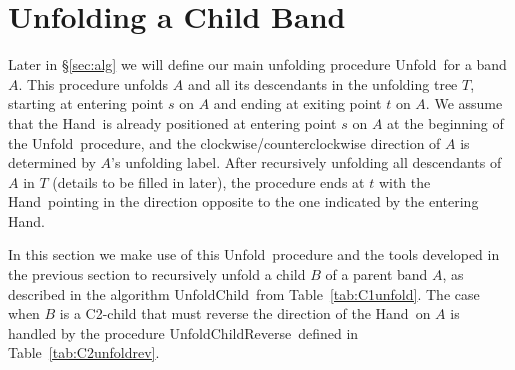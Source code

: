 \documentclass[11pt]{article}
\newcommand\hand{{\sc Hand}}
\newcommand\unfold{{\sc UnfoldChild}}
\newcommand\unfoldrev{{\sc UnfoldChildReverse}}
\newcommand\unfoldrims{{\sc Unfold}}
\begin{document}
\section{Unfolding a Child Band}
\label{sec:unfchild}
\medskip
\noindent
Later in \S\ref{sec:alg} we will define our main unfolding procedure \unfoldrims\ for a band $A$. This procedure unfolds $A$ and all its descendants in the unfolding tree $T$, starting at entering point $s$ on $A$ and ending at exiting point $t$ on $A$. We assume that the \hand\ is already positioned at entering point $s$ on $A$ at the beginning of the \unfoldrims\  procedure, and the clockwise/counterclockwise direction of $A$ is determined by $A$'s unfolding label. After recursively unfolding all descendants of $A$ in $T$ (details to be filled in later), the procedure ends at $t$ with the \hand\ pointing in the direction opposite to the one indicated by the entering \hand. 


In this section we make use of this \unfoldrims\ procedure and the tools developed in the previous section to recursively unfold a child $B$ of a parent band $A$, as described in the algorithm \unfold\ from Table~\ref{tab:C1unfold}. The case when $B$ is a C2-child that must reverse the direction of the \hand\ on $A$ is handled by the procedure \unfoldrev\ defined in Table~\ref{tab:C2unfoldrev}.
\end{document}
